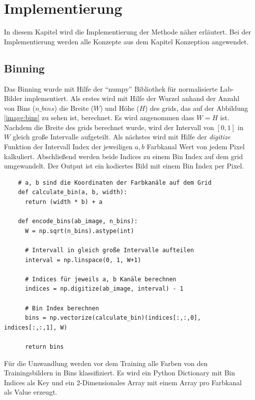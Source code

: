 \chapter{Implementierung}
In diesem Kapitel wird die Implementierung der Methode näher erläutert. Bei der Implementierung werden alle Konzepte aus dem
Kapitel Konzeption angewendet.

\section{Binning}
Das Binning wurde mit Hilfe der ``numpy'' Bibliothek für normalisierte Lab-Bilder implementiert. 
Als erstes wird mit Hilfe der Wurzel
anhand der Anzahl von Bins ($n\_bins$) die Breite ($W$) und Höhe ($H$) des \gls{grid}s, das auf der Abbildung \ref{image:bins} zu sehen ist,
berechnet. Es wird angenommen dass $W = H$ ist.
Nachdem die Breite des \gls{grid}s berechnet wurde, wird der Intervall von $[0, 1]$ in $W$ gleich große Intervalle aufgeteilt. Als nächstes
wird mit Hilfe der \textit{digitize} Funktion der Intervall Index der jeweiligen $a, b$ Farbkanal Wert von jedem Pixel kalkuliert. 
Abschließend werden beide Indices zu einem Bin Index auf dem \gls{grid} umgewandelt. Der Output ist ein kodiertes Bild mit einem Bin Index per Pixel.
\\

\begin{listing}[H]
  \begin{verbatim}
    # a, b sind die Koordinaten der Farbkanäle auf dem Grid
    def calculate_bin(a, b, width):
      return (width * b) + a
  
    def encode_bins(ab_image, n_bins):
      W = np.sqrt(n_bins).astype(int)
  
      # Intervall in gleich große Intervalle aufteilen
      interval = np.linspace(0, 1, W+1)
  
      # Indices für jeweils a, b Kanäle berechnen
      indices = np.digitize(ab_image, interval) - 1
  
      # Bin Index berechnen
      bins = np.vectorize(calculate_bin)(indices[:,:,0], indices[:,:,1], W)
  
      return bins
  \end{verbatim}
\end{listing}

Für die Umwandlung werden vor dem Training alle Farben von den Trainingsbildern in Bins klassifiziert. Es wird ein Python Dictionary mit Bin
Indices als Key und ein 2-Dimensionales Array mit einem Array pro Farbkanal als Value erzeugt.

